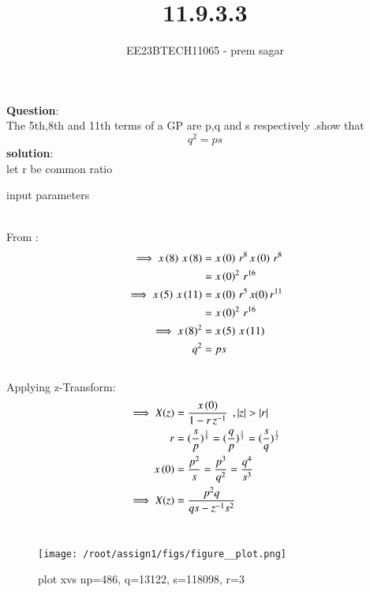 \documentclass[journal,12pt,twocolumn]{IEEEtran}
\theoremstyle{remark}
\begin{document}

\vspace{3cm}

\title{11.9.3.3}
\author{EE23BTECH11065 - prem sagar}
\maketitle
\newpage

\bigskip 

\renewcommand{\thefigure}{\theenumi}
\renewcommand{\thetable}{\theenumi}
\textbf{Question}:\\ The 5th,8th and 11th terms of a GP are p,q and s respectively .show that \[q^2=ps\]
\textbf{solution}:
\\let r be common ratio
\begin{table}[!ht]
   \centering
    \renewcommand\thetable{1}
      
    \caption{input parameters}
    \label{tab:11.9.3}
 \end{table}
\\ From :
\begin{align}
\implies x\left(8\right)\,x\left(8\right)&=x\left(0\right)\,r^8\,x\left(0\right)\,r^8
     \\ &=x\left(0\right)^2\,r^{16}
\\\implies x\left(5\right)\,x\left({11}\right)&=x\left(0\right)\,r^5\,x(0)\,r^{11}
       \\&=x\left(0\right)^2\,r^{16}
\\\implies x\left(8\right)^2&=x\left(5\right)\,x\left({11}\right)
\\q^2&=ps
\end{align}
\\Applying z-Transform:
\\\begin{align}
 \implies    X(z) &= \frac{x\brak{0}}{1-r\,z^{-1}}\: \:,|z|>|r|
          \\r&=(\frac{s}{p})^\frac{1}{5}=(\frac{q}{p})^\frac{1}{3}=(\frac{s}{q})^\frac{1}{2}
          \\x\brak{0}&=\frac{p^2}{s}=\frac{p^3}{q^2}=\frac{q^4}{s^3}
 \\\implies       X(z)&=\frac{p^2q}{qs-z^{-1}s^2}
     \end{align}    
\\\begin{figure}[h]
   \renewcommand\thefigure{1}
    \centering
    \texttt{[image: /root/assign1/figs/figure\_\_plot.png]}
    \caption{plot xvs n\hspace{0.1cm}p=486,
    \hspace{0.1cm}q=13122,
    \hspace{0.1cm}s=118098,
    \hspace{0.1cm}r=3}
    \label{fig:1}
\end{figure}\\
\end{document}
